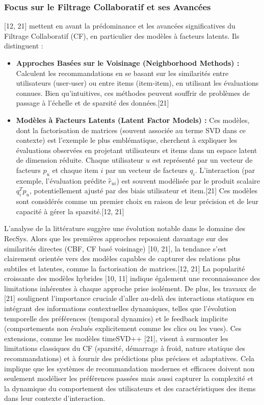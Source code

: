 \documentclass[11pt,a4paper]{article}
\begin{document}
\subsubsection{Focus sur le Filtrage Collaboratif et ses Avancées}
\citet{Koren2011} [12, 21] mettent en avant la prédominance et les avancées significatives du Filtrage Collaboratif (CF), en particulier des modèles à facteurs latents. Ils distinguent :
\begin{itemize}
    \item \textbf{Approches Basées sur le Voisinage (Neighborhood Methods) :} Calculent les recommandations en se basant sur les similarités entre utilisateurs (user-user) ou entre items (item-item), en utilisant les évaluations connues. Bien qu'intuitives, ces méthodes peuvent souffrir de problèmes de passage à l'échelle et de sparsité des données.[21]
    \item \textbf{Modèles à Facteurs Latents (Latent Factor Models) :} Ces modèles, dont la factorisation de matrices (souvent associée au terme SVD dans ce contexte) est l'exemple le plus emblématique, cherchent à expliquer les évaluations observées en projetant utilisateurs et items dans un espace latent de dimension réduite. Chaque utilisateur $u$ est représenté par un vecteur de facteurs $p_u$ et chaque item $i$ par un vecteur de facteurs $q_i$. L'interaction (par exemple, l'évaluation prédite $r̂_{ui}$) est souvent modélisée par le produit scalaire $q_i^T p_u$, potentiellement ajusté par des biais utilisateur et item.[21] Ces modèles sont considérés comme un premier choix en raison de leur précision et de leur capacité à gérer la sparsité.[12, 21]
\end{itemize}

L'analyse de la littérature suggère une évolution notable dans le domaine des RecSys. Alors que les premières approches reposaient davantage sur des similarités directes (CBF, CF basé voisinage) [10, 21], la tendance s'est clairement orientée vers des modèles capables de capturer des relations plus subtiles et latentes, comme la factorisation de matrices.[12, 21] La popularité croissante des modèles hybrides [10, 11] indique également une reconnaissance des limitations inhérentes à chaque approche prise isolément. De plus, les travaux de \citet{Koren2011} [21] soulignent l'importance cruciale d'aller au-delà des interactions statiques en intégrant des informations contextuelles dynamiques, telles que l'évolution temporelle des préférences (temporal dynamics) et le feedback implicite (comportements non évalués explicitement comme les clics ou les vues). Ces extensions, comme les modèles timeSVD++ [21], visent à surmonter les limitations classiques du CF (sparsité, démarrage à froid, nature statique des recommandations) et à fournir des prédictions plus précises et adaptatives. Cela implique que les systèmes de recommandation modernes et efficaces doivent non seulement modéliser les préférences passées mais aussi capturer la complexité et la dynamique du comportement des utilisateurs et des caractéristiques des items dans leur contexte d'interaction.
\end{document}
